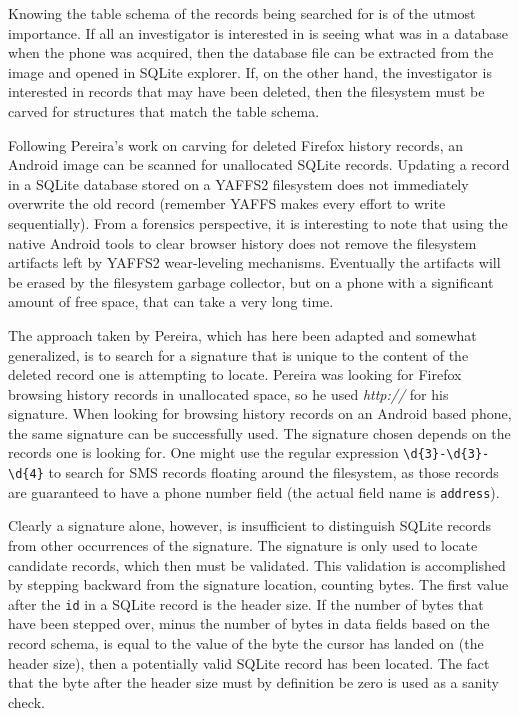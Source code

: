Knowing the table schema of the records being searched for is of the utmost importance.  If all an investigator is interested in is
seeing what was in a database when the phone was acquired, then the database file can be extracted from the image and opened in
SQLite explorer.  If, on the other hand, the investigator is interested in records that may have been deleted, then the filesystem
must be carved for structures that match the table schema.

Following Pereira's work on carving for deleted Firefox history records, an Android image can be scanned for unallocated SQLite
records.  Updating a record in a SQLite database stored on a YAFFS2 filesystem does not immediately overwrite the old record
(remember YAFFS makes every effort to write sequentially).  From a forensics perspective, it is interesting to note that using the
native Android tools to clear browser history does not remove the filesystem artifacts left by YAFFS2 wear-leveling mechanisms.
Eventually the artifacts will be erased by the filesystem garbage collector, but on a phone with a significant amount of free space,
that can take a very long time.

The approach taken by Pereira, which has here been adapted and somewhat generalized, is to search for a signature that is unique to
the content of the deleted record one is attempting to locate.  Pereira was looking for Firefox browsing history records in
unallocated space, so he used \emph{http://} for his signature.  When looking for browsing history records on an Android based
phone, the same signature can be successfully used.  The signature chosen depends on the records one is looking for.  One might use
the regular expression \verb|\d{3}-\d{3}-\d{4}| to search for SMS records floating around the filesystem, as those records are guaranteed
to have a phone number field (the actual field name is \texttt{address}). 

Clearly a signature alone, however, is insufficient to distinguish SQLite records from other occurrences of the signature.  The
signature is only used to locate candidate records, which then must be validated.  This validation is accomplished by stepping
backward from the signature location, counting bytes.  The first value after the \texttt{id} in a SQLite record is the header size.
If the number of bytes that have been stepped over, minus the number of bytes in data fields based on the record schema, is equal to
the value of the byte the cursor has landed on (the header size), then a potentially valid SQLite record has been located.  The fact
that the byte after the header size must by definition be zero is used as a sanity check.

